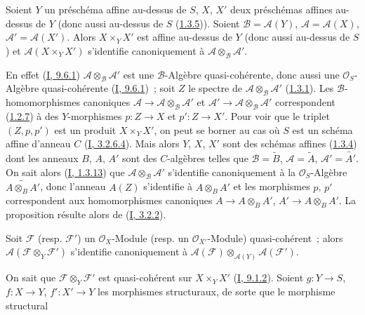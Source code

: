\begin{proposition}[1.4.6]
\label{II.1.4.6-fr}
Soient $Y$ un préschéma affine au-dessus de $S$, $X$, $X'$ deux préschémas
affines au-dessus de $Y$ (donc aussi au-dessus de $S$
(\hyperref[II.1.3.5-fr]{1.3.5})). Soient
$\mathcal{B}=\mathcal{A}(Y)$, $\mathcal{A}=\mathcal{A}(X)$,
$\mathcal{A}'=\mathcal{A}(X')$. Alors $X\times_Y X'$ est affine au-dessus de
$Y$ (donc aussi au-dessus de $S$) et $\mathcal{A}(X\times_Y X')$
s'identifie canoniquement à $\mathcal{A}\otimes_{\mathcal{B}}\mathcal{A}'$.
\end{proposition}

En effet (\hyperref[I.9.6.1-fr]{I, 9.6.1})
$\mathcal{A}\otimes_{\mathcal{B}}\mathcal{A}'$ est une
$\mathcal{B}$-Algèbre quasi-cohérente, donc aussi une
$\mathcal{O}_S$-Algèbre quasi-cohérente
(\hyperref[I.9.6.1-fr]{I, 9.6.1})~; soit $Z$ le spectre de
$\mathcal{A}\otimes_{\mathcal{B}}\mathcal{A}'$
(\hyperref[II.1.3.1-fr]{1.3.1}). Les $\mathcal{B}$-homomorphismes canoniques
$\mathcal{A}\to\mathcal{A}\otimes_{\mathcal{B}}\mathcal{A}'$ et
$\mathcal{A}'\to\mathcal{A}\otimes_{\mathcal{B}}\mathcal{A}'$ correspondent
(\hyperref[II.1.2.7-fr]{1.2.7}) à des $Y$-morphismes $p:Z\to X$ et
$p':Z\to X'$. Pour voir que le triplet $(Z,p,p')$ est un produit
$X\times_Y X'$, on peut se borner au cas où $S$ est un schéma affine
d'anneau $C$ (\hyperref[I.3.2.6.4-fr]{I, 3.2.6.4}). Mais alors $Y$, $X$,
$X'$ sont des schémas affines (\hyperref[II.1.3.4-fr]{1.3.4}) dont les
anneaux $B$, $A$, $A'$ sont des $C$-algèbres telles que
$\mathcal{B}=\widetilde{B}$, $\mathcal{A}=\widetilde{A}$,
$\mathcal{A}'=\widetilde{A'}$. On sait alors
(\hyperref[I.1.3.13-fr]{I, 1.3.13}) que
$\mathcal{A}\otimes_{\mathcal{B}}\mathcal{A}'$ s'identifie canoniquement à
la $\mathcal{O}_S$-Algèbre $\widetilde{A\otimes_B A'}$, donc l'anneau
$A(Z)$ s'identifie à $A\otimes_B A'$ et les morphismes $p$, $p'$ correspondent
aux homomorphismes canoniques $A\to A\otimes_B A'$,
$A'\to A\otimes_B A'$. La proposition résulte alors de
(\hyperref[I.3.2.2-fr]{I, 3.2.2}).

\begin{corollary}[1.4.7]
\label{II.1.4.7-fr}
Soit $\mathcal{F}$ (resp. $\mathcal{F}'$) un $\mathcal{O}_X$-Module (resp. un
$\mathcal{O}_{X'}$-Module) quasi-cohérent~; alors
$\mathcal{A}(\mathcal{F}\otimes_Y\mathcal{F}')$ s'identifie canoniquement à
$\mathcal{A}(\mathcal{F})\otimes_{\mathcal{A}(Y)}
\mathcal{A}(\mathcal{F}')$.
\end{corollary}

On sait que $\mathcal{F}\otimes_Y\mathcal{F}'$ est quasi-cohérent sur
$X\times_Y X'$ (\hyperref[I.9.1.2-fr]{I, 9.1.2}). Soient $g:Y\to S$,
$f:X\to Y$, $f':X'\to Y$ les morphismes structuraux, de sorte que le
morphisme structural
